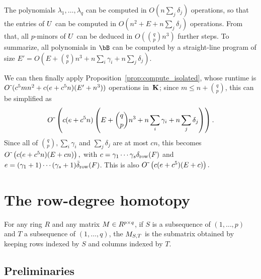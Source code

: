 \documentclass[12pt]{article}
\begin{document}
The polynomials $\lambda_1,\dots,\lambda_q$ can be computed in $O(n \sum_j
\delta_j)$ operations, so that the entries of ${U}$ can be computed in
$O(n^2 + E + n \sum_j \delta_j)$ operations. From that, all $p$-minors
of ${U}$ can be deduced in $O({q \choose p} n^3)$ further steps.
To summarize, all polynomials in $\bB$ can be computed by a straight-line
program of size
$E'=O(E + {q \choose p} n^3 +n \sum_i \gamma_i + n \sum_j \delta_j)$.

\medskip

We can then finally apply Proposition~\ref{prop:compute_isolated},
whose runtime is ${O}{\,\tilde{ }\,}(c^5 m n^2 + c(e+c^5 n)(E' + n^3))$ operations
in~$\mathbf{K}$; since $m \le n + {q \choose p}$, this can be simplified as
$${O}{\,\tilde{ }\,}\left (c(e+c^5 n)\left(E + {q \choose p} n^3 +n \sum_i
\gamma_i + n \sum_j \delta_j\right)\right).$$ Since all of $ {q
  \choose p}, \sum_i \gamma_i$ and $\sum_j \delta_j$ are at most $cn$, this becomes ${O}{\,\tilde{ }\,}\left (c(e+c^5 n)(E + cn)\right),$
with $c=\gamma_1\cdots\gamma_s \delta_{\rm row}({F})$ and
$e=(\gamma_1+1)\cdots(\gamma_s+1) \tilde\delta_{\rm row}({F})$.
This is also  ${O}{\,\tilde{ }\,}\left (c(e+c^5 )(E + c)\right).$



\section{The row-degree homotopy}

For any ring $R$ and any matrix ${M} \in R^{p\times q}$, if $S$ is a
subsequence of $(1,\dots,p)$ and $T$ a subsequence of $(1,\dots,q)$,
the ${M}_{S,T}$ is the submatrix obtained by keeping rows indexed by
$S$ and columns indexed by $T$.


\subsection{Preliminaries}
\end{document}
